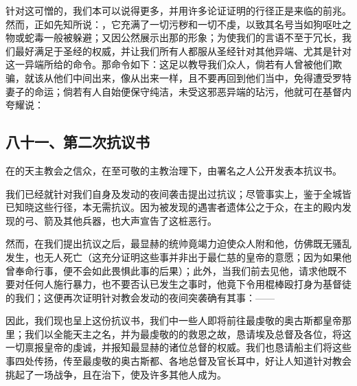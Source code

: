 针对这可憎的，我们本可以说得更多，并用许多论证证明的行径正是来临的前兆。然而，正如先知所说：，它充满了一切污秽和一切不虔，以致其名号当如狗呕吐之物或蛇毒一般被躲避；又因公然展示出那的形象；为使我们的言语不至于冗长，我们最好满足于圣经的权威，并让我们所有人都服从圣经针对其他异端、尤其是针对这一异端所给的命令。那命令如下：这足以教导我们众人，倘若有人曾被他们欺骗，就该从他们中间出来，像从出来一样，且不要再回到他们当中，免得遭受罗特妻子的命运；倘若有人自始便保守纯洁，未受这邪恶异端的玷污，他就可在基督内夸耀说：\par


\subsection{八十一、第二次抗议书}

在的天主教会之信众，在至可敬的主教治理下，由署名之人公开发表本抗议书。\par

我们已经就针对我们自身及发动的夜间袭击提出过抗议；尽管事实上，鉴于全城皆已知晓这些行径，本无需抗议。因为被发现的遇害者遗体公之于众，在主的殿内发现的弓、箭及其他兵器，也大声宣告了这桩恶行。\par

然而，在我们提出抗议之后，最显赫的统帅竟竭力迫使众人附和他，仿佛既无骚乱发生，也无人死亡（这充分证明这些事并非出于最仁慈的皇帝的意愿；因为如果他曾奉命行事，便不会如此畏惧此事的后果）；此外，当我们前去见他，请求他既不要对任何人施行暴力，也不要否认已发生之事时，他竟下令用棍棒殴打身为基督徒的我们；这便再次证明针对教会发动的夜间突袭确有其事：——\par

因此，我们现也呈上这份抗议书，我们中一些人即将前往最虔敬的奥古斯都皇帝那里；我们以全能天主之名，并为最虔敬的的救恩之故，恳请埃及总督及各位，将这一切禀报皇帝的虔诚，并报知最显赫的诸位总督的权威。我们也恳请船主们将这些事四处传扬，传至最虔敬的奥古斯都、各地总督及官长耳中，好让人知道针对教会挑起了一场战争，且在治下，使及许多其他人成为。\par

